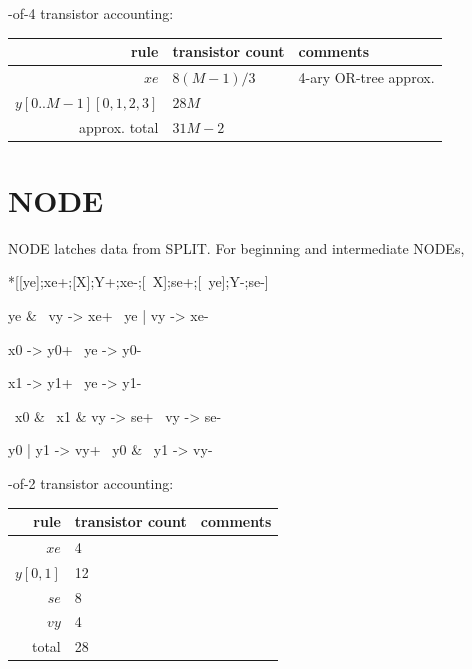 \documentclass{article}
\begin{document}
-of-4 transistor accounting:

\begin{center}
    \begin{tabular}{|r|l|l|}
    \hline
    rule & transistor count & comments \\ \hline
    $xe$ & $8(M-1)/3$ & 4-ary OR-tree approx. \\ \hline
    $y[0..M-1][0,1,2,3]$ & $28M$ & \\ \hline
    \hline approx. total & $31M-2$ & \\ \hline
    \end{tabular}
\end{center}

\section{NODE \label{sec:DESERIAL_SPLITCHAIN_NODE}}

NODE latches data from SPLIT. For beginning and intermediate NODEs,

\begin{hse}
*[[ye];xe+;[X];Y+;xe-;[~X];se+;[~ye];Y-;se-]
\end{hse}

\begin{prs2}
ye & ~vy -> xe+
~ye | vy -> xe-
\end{prs2}

\begin{prs2}
x0 -> y0+
~ye -> y0-

x1 -> y1+
~ye -> y1-
\end{prs2}

\begin{prs2}
~x0 & ~x1 & vy -> se+
~vy -> se-
\end{prs2}

\begin{prs2}
y0 | y1 -> vy+
~y0 & ~y1 -> vy-
\end{prs2}

-of-2 transistor accounting:

\begin{center}
    \begin{tabular}{|r|l|l|}
    \hline
    rule & transistor count & comments \\ \hline
    $xe$ & 4 & \\ \hline
    $y[0,1]$ & 12 & \\ \hline
    $se$ & 8 & \\ \hline
    $vy$ & 4 & \\ \hline
    \hline total & 28 & \\ \hline
    \end{tabular}
\end{center}
\end{document}
